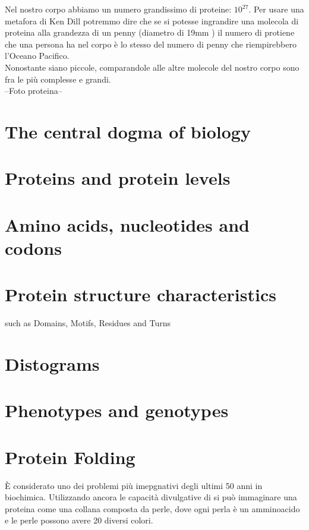 Nel nostro corpo abbiamo un numero grandissimo di proteine: $10^{27}$. Per usare una metafora di Ken Dill \cite{TalksDill2013Oct} potremmo dire che se si potesse ingrandire una molecola di proteina alla grandezza di un penny (diametro di 19mm \cite{CentWikipedia}) il numero di protiene che una persona ha nel corpo è lo stesso del numero di penny che riempirebbero l'Oceano Pacifico.\\

Nonostante siano piccole, comparandole alle altre molecole del nostro corpo sono fra le più complesse e grandi.\\

--Foto proteina--\\



\section{The central dogma of biology}

\section{Proteins and protein levels}

\section{Amino acids, nucleotides and codons}

\section{Protein structure characteristics}
such as Domains, Motifs, Residues and Turns

\section{Distograms}

\section{Phenotypes and genotypes}

\section{Protein Folding}
È considerato uno dei problemi più imepgnativi degli ultimi 50 anni in biochimica.
Utilizzando ancora le capacità divulgative di \cite{TalksDill2013Oct} si può immaginare una proteina come una collana composta da perle, dove ogni perla è un amminoacido e le perle possono avere 20 diversi colori.

